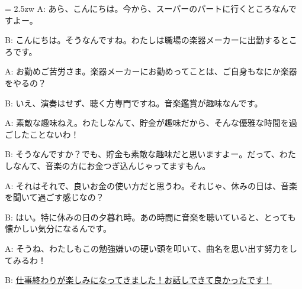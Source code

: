 \documentclass[11pt]{amsart}
\title{}
\author{}
\newenvironment{hangall}[1]{\hangindent = 2.5zw\everypar{\hangindent = 2.5zw}}{}
\begin{document}
\maketitle
\begin{hangall}{}%
A: あら、こんにちは。今から、スーパーのパートに行くところなんですよー。

B: こんにちは。そうなんですね。わたしは職場の楽器メーカーに出勤するところです。

A: お勤めご苦労さま。楽器メーカーにお勤めってことは、ご自身もなにか楽器をやるの？

B: いえ、演奏はせず、聴く方専門ですね。音楽鑑賞が趣味なんです。

A: 素敵な趣味ねえ。わたしなんて、貯金が趣味だから、そんな優雅な時間を過ごしたことないわ！

B: そうなんですか？でも、貯金も素敵な趣味だと思いますよー。だって、わたしなんて、音楽の方にお金つぎ込んじゃってますもん。

A: それはそれで、良いお金の使い方だと思うわ。それじゃ、休みの日は、音楽を聞いて過ごす感じなの？

B: はい。特に休みの日の夕暮れ時。あの時間に音楽を聴いていると、とっても懐かしい気分になるんです。

A: そうね、わたしもこの勉強嫌いの硬い頭を叩いて、曲名を思い出す努力をしてみるわ！

B: \ul{仕事終わりが楽しみになってきました！お話しできて良かったです！}\end{hangall}
\end{document}
